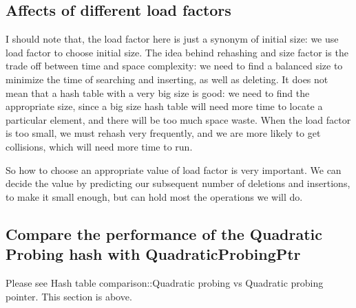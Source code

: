 \documentclass[]{article}
\begin{document}
\subsection{Affects of different load
factors}\label{affects-of-different-load-factors}

I should note that, the load factor here is just a synonym of initial
size: we use load factor to choose initial size. The idea behind
rehashing and size factor is the trade off between time and space
complexity: we need to find a balanced size to minimize the time of
searching and inserting, as well as deleting. It does not mean that a
hash table with a very big size is good: we need to find the appropriate
size, since a big size hash table will need more time to locate a
particular element, and there will be too much space waste. When the
load factor is too small, we must rehash very frequently, and we are
more likely to get collisions, which will need more time to run.

So how to choose an appropriate value of load factor is very important.
We can decide the value by predicting our subsequent number of deletions
and insertions, to make it small enough, but can hold most the
operations we will do.

\subsection{Compare the performance of the Quadratic Probing hash with
QuadraticProbingPtr}\label{compare-the-performance-of-the-quadratic-probing-hash-with-quadraticprobingptr}

Please see Hash table comparison::Quadratic probing vs Quadratic probing
pointer. This section is above.
\end{document}
